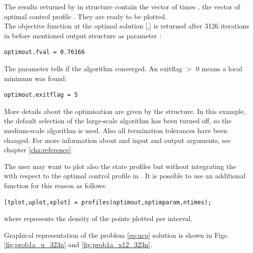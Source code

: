 The results returned by  in  structure
contain the vector of times , the vector of optimal control
profile . They are ready to be plotted.\\
The objective function at the optimal solution [,]
is returned after 3126 iterations in before mentioned output structure
 as parameter :
\begin{verbatim}
optimout.fval = 0.76166
\end{verbatim}
The parameter  tells if the algorithm converged. An
exitflag $>$ 0 means a local minimum was found: 
\begin{verbatim}
optimout.exitflag = 5
\end{verbatim}
More details about the optimisation are given by the
 structure. In this example, the default
selection of the large-scale algorithm has been turned off, so the
medium-scale algorithm is used. Also all termination tolerances have
been changed. For more information about  and
 input and output arguments, see chapter
\ref{cha:reference}. 

The user may want to plot also the state profiles but without
integrating the  with respect to the optimal control
profile in . It is possible to use an additional
function  for this reason as follows:
\begin{verbatim}
[tplot,uplot,xplot] = profiles(optimout,optimparam,ntimes);
\end{verbatim}
where  represents the density of the points plotted per
interval.

Graphical representation of the problem \eqref{eq:ucp} solution is
shown in Figs. \ref{fig:prob1a_u_323n} and \ref{fig:prob1a_x12_323n}. 

